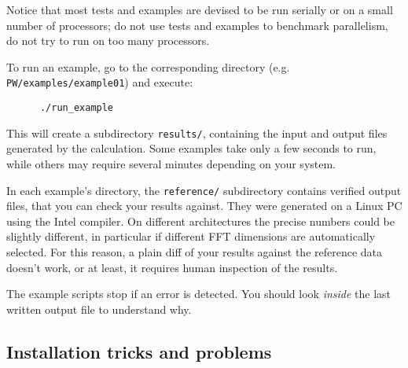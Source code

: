 \documentclass[12pt,a4paper]{article}
\begin{document}
Notice that most tests and examples are devised to be run serially
or on a small number of processors; do not use tests and examples
to benchmark parallelism, do not try to run on too many processors.

To run an example, go to the corresponding directory (e.g.
 \texttt{PW/examples/example01}) and execute:
\begin{verbatim}
      ./run_example
\end{verbatim}
This will create a subdirectory \texttt{results/}, containing the input and
output files generated by the calculation. Some examples take only a
few seconds to run, while others may require several minutes depending
on your system.

In each example's directory, the \texttt{reference/} subdirectory contains
verified output files, that you can check your results against. They
were generated on a Linux PC using the Intel compiler. On different
architectures the precise numbers could be slightly different, in
particular if different FFT dimensions are automatically selected. For
this reason, a plain diff of your results against the reference data
doesn't work, or at least, it requires human inspection of the results.

The example scripts stop if an error is detected. You should look {\em inside}
the last written output file to understand why.

\subsection{Installation tricks and problems}
\end{document}

